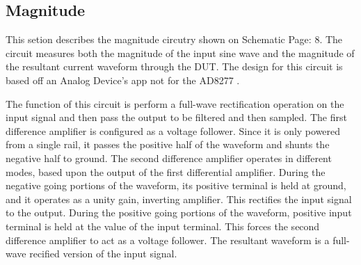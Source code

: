 \subsection{Magnitude}

This setion describes the magnitude circutry shown on Schematic Page: 8. The circuit measures both the magnitude of the input sine wave and the magnitude of the resultant current waveform through the DUT. The design for this circuit is based off an Analog Device's app not for the AD8277 \cite{absCircuit}.

The function of this circuit is perform a full-wave rectification operation on the input signal and then pass the output to be filtered and then sampled. The first difference amplifier is configured as a voltage follower. Since it is only powered from a single rail, it passes the positive half of the waveform and shunts the negative half to ground. The second difference amplifier operates in different modes, based upon the output of the first differential amplifier. During the negative going portions of the waveform, its positive terminal is held at ground, and it operates as a unity gain, inverting amplifier. This rectifies the input signal to the output. During the positive going portions of the waveform, positive input terminal is held at the value of the input terminal. This forces the second difference amplifier to act as a voltage follower. The resultant waveform is a full-wave recified version of the input signal.

